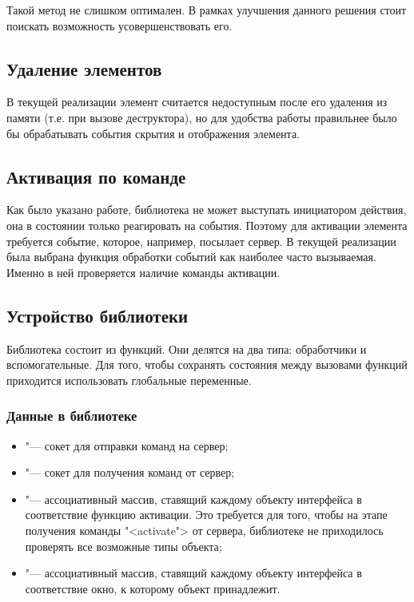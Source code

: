 Такой метод не слишком оптимален. В рамках улучшения данного решения стоит
поискать возможность усовершенствовать его.

\subsection{Удаление элементов}

В текущей реализации элемент считается недоступным после его удаления из памяти
(т.е. при вызове деструктора), но для удобства работы правильнее было бы
обрабатывать события скрытия и отображения элемента.

\subsection{Активация по команде}

Как было указано работе\cite{polshakovinject}, библиотека не
может выступать инициатором действия, она в состоянии только реагировать на
события. Поэтому для активации элемента требуется событие, которое, например,
посылает сервер. В текущей реализации была выбрана функция обработки событий как
наиболее часто вызываемая. Именно в ней проверяется наличие команды активации.

\subsection{Устройство библиотеки}

Библиотека состоит из функций. Они делятся на два типа: обработчики и 
вспомогательные. Для того, чтобы сохранять состояния между вызовами функций 
приходится использовать глобальные переменные.

\subsubsection{Данные в библиотеке}

\begin{itemize}
	\item {} "--- сокет для отправки команд на сервер;
	\item {} "--- сокет для получения команд от сервер;
	\item {} "--- ассоциативный массив, ставящий каждому объекту
	интерфейса в соответствие функцию активации. Это требуется для того, чтобы
	на этапе получения команды "<activate"> от сервера, библиотеке не 
	приходилось проверять все возможные типы объекта;
	\item {} "--- ассоциативный массив, ставящий каждому
	объекту интерфейса в соответствие окно, к которому объект принадлежит.
\end{itemize}

